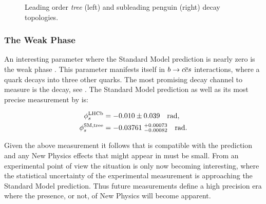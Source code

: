 \begin{figure}[t]
  \begin{subfigure}{0.5\textwidth}
    \raggedright
    {\scalebox{1}{\sffamily }}
    \caption{}
    \label{app_jpsiphi_tree}
  \end{subfigure}%
  \hfill
  \begin{subfigure}{0.5\textwidth}
    \raggedleft
    {\scalebox{1}{\sffamily }}
    \caption{}
    \label{app_jpsiphi_peng}
  \end{subfigure}
    \caption{Leading order {\it tree} (left) and subleading penguin (right) \BsJpsiPhi decay topologies.}
  \label{app_jpsiphi_tree_peng}
\end{figure}


\subsubsection{The Weak Phase \phis}

An interesting parameter where the Standard Model prediction is nearly zero is the weak phase \phis.
This parameter manifests itself in $b\rightarrow c\overline {c}s$ interactions, where a \bquark
quark decays into three other quarks. The most promising decay channel to measure \phis is the \BsJpsiPhi
decay, see . The Standard Model \phis prediction as well as its most
precise measurement by \lhcb is:

\begin{subequations}
  \label{app_phis_lhcb_theo}
  \begin{align}
  \centering
  \phiS{\lhcb}           &=  -0.010 \pm 0.039  \quad {\rm rad},
  \label{app_phis_lhcb}\\
  \phiS{SM,tree}  &= -0.03761 \; ^{+0.00073}_{-0.00082}  \quad {\rm rad}.
  \label{app_phis_theo}
\end{align}
\end{subequations}

\noindent Given the above measurement it follows that \phis is compatible
with the prediction and any New Physics effects that might appear in \phis must be small.
From an experimental point of view the situation is only now becoming interesting,
where the statistical uncertainty of the experimental measurement is approaching
the Standard Model prediction. Thus future \phis measurements define a high precision
era where the presence, or not, of New Physics will become apparent.

